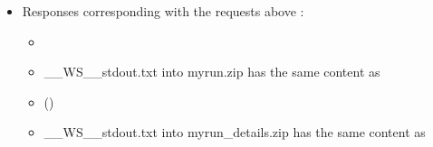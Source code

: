 \documentclass[letterpaper,10pt,openany,oneside,english]{sphinxmanual}
\begin{document}
\begin{itemize}
\item {} 
\sphinxAtStartPar
Responses corresponding with the requests above :
\begin{itemize}
\item {} 
\sphinxAtStartPar
{}

\item {} 
\sphinxAtStartPar
\_\_WS\_\_stdout.txt into myrun.zip has the same content as

\item {} 
\sphinxAtStartPar
{} ()

\item {} 
\sphinxAtStartPar
\_\_WS\_\_stdout.txt into myrun\_details.zip has the same content as

\end{itemize}

\end{itemize}



\renewcommand{\indexname}{Index}
\printindex
\end{document}
